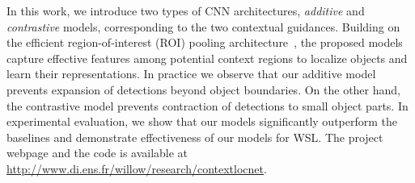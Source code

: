 
In this work, we introduce two types of CNN architectures, {\it additive} and
{\it contrastive} models, corresponding to the two contextual guidances. 
Building on the efficient region-of-interest (ROI) pooling
architecture~\cite{ren15fasterrcnn}, the proposed models capture effective
features among potential context regions to localize objects and learn their
representations.
In practice we observe that our additive model prevents expansion of detections
beyond object boundaries. On the other hand, the contrastive model prevents
contraction of detections to small object parts.
In experimental evaluation, we show that our models
significantly outperform the baselines and demonstrate effectiveness of our models for WSL. The project webpage and the code is available at \url{http://www.di.ens.fr/willow/research/contextlocnet}.

